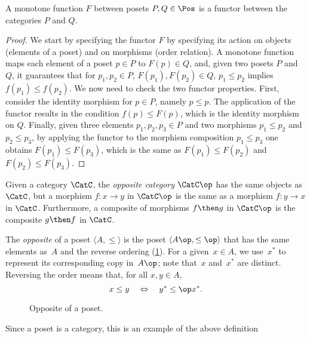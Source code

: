 \begin{lemma}
A monotone function $F$ between posets $P,Q \in \Pos$ is a functor between the categories $P$ and $Q$.
\end{lemma}
\begin{proof}
We start by specifying the functor $F$ by specifying its action on objects (elements of a poset) and on morphisms (order relation). A monotone function maps each element of a poset $p\in P$ to $F(p) \in Q$, and, given two posets $P$ and $Q$, it guarantees that for $p_1,p_2\in P$, $F(p_1),F(p_2)\in Q$,  $p_1\leq p_2$ implies $f(p_1)\leq f(p_2)$. We now need to check the two functor properties. First, consider the identity morphism for $p\in P$, namely $p\leq p$. The application of the functor results in the condition $f(p)\leq F(p)$, which is the identity morphism on $Q$. Finally, given three elements $p_1,p_2,p_3\in P$ and two morphisms $p_1\leq p_2$ and $p_2\leq p_3$, by applying the functor to the morphism composition $p_1\leq p_3$ one obtains $F(p_1)\leq F(p_3)$, which is the same as $F(p_1)\leq F(p_2)$ and $F(p_2)\leq F(p_3)$.
\end{proof}

\begin{shaded}
\begin{definition}
Given a category $\CatC$, the \emph{opposite category} $\CatC\op$ has the same objects as $\CatC$, but a morphism $f\colon x\to y$ in $\CatC\op$ is the same as a morphism $f\colon y\to x$ in $\CatC$. Furthermore, a composite of morphisms $f\then g$ in $\CatC\op$ is the composite $g\then f$ in $\CatC$.
\end{definition}
\end{shaded}

\begin{example}
    The \emph{opposite} of a  poset $\langle A, \leq \rangle $ is the poset $\langle A\op, \leq\op\rangle $ that has the same elements as~$A$ and the reverse ordering (\cref{fig:opposite}).
    For a given~$x \in A$, we use~$x^*$ to represent its corresponding copy in~$A\op$;
    note that~$x$ and~$x^*$ are distinct.
    Reversing the order means that, for all $x,y\in A$,
    \begin{equation}
        x \leq y \quad \Leftrightarrow \quad y^* \leq\op x^*.
    \end{equation}
    \begin{figure}[h!]
   \centering
   \caption{Opposite of a poset.\label{fig:opposite}}
\end{figure}
Since a poset is a category, this is an example of the above definition
\end{example}

